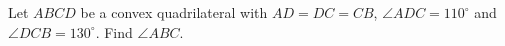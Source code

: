 Let $ABCD$ be a convex quadrilateral with $AD=DC=CB$, $\angle ADC=110^\circ$ and $\angle DCB=130^\circ$. Find $\angle ABC$.
